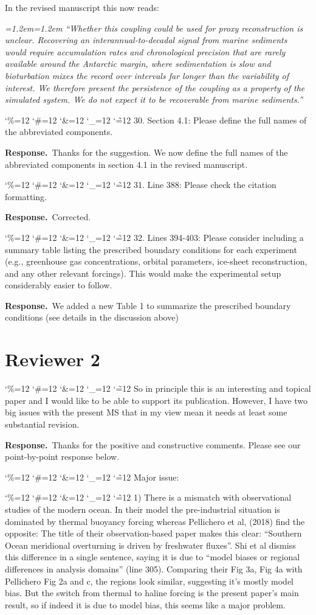 \documentclass[11pt,a4paper]{article}
\newcommand{\reviewer}[1]{\section*{#1}}
\newcommand{\comment}[1]{\par\medskip\noindent\color{black}\begingroup\catcode`\%=12 \catcode`\#=12 \catcode`\&=12 \catcode`\_=12 \catcode`\~=12 \commentbody}
\newcommand{\commentbody}[1]{#1\endgroup\par\smallskip}
\newcommand{\response}{\par\noindent\color{chgcol}\textbf{Response.}\ }
\newenvironment{change}{\par\smallskip\color{chgcol}\small\itshape\leftskip=1.2em\rightskip=1.2em\noindent\ignorespaces}{\par\smallskip}
\begin{document}
In the revised manuscript this now reads:

\begin{change}
``Whether this coupling could be used for proxy reconstruction is unclear. Recovering an interannual-to-decadal signal from marine sediments would require accumulation rates and chronological precision that are rarely available around the Antarctic margin, where sedimentation is slow and bioturbation mixes the record over intervals far longer than the variability of interest. We therefore present the persistence of the coupling as a property of the simulated system. We do not expect it to be recoverable from marine sediments.''
\end{change}

\comment{R1}{30. Section 4.1: Please define the full names of the abbreviated components.}

\response Thanks for the suggestion. We now define the full names of the abbreviated components in section 4.1 in the revised manuscript.

\comment{R1}{31. Line 388: Please check the citation formatting.}

\response Corrected.

\comment{R1}{32. Lines 394-403: Please consider including a summary table listing the prescribed boundary conditions for each experiment (e.g., greenhouse gas concentrations, orbital parameters, ice-sheet reconstruction, and any other relevant forcings). This would make the experimental setup considerably easier to follow.}

\response We added a new Table 1 to summarize the prescribed boundary conditions (see details in the discussion above)



\reviewer{Reviewer 2}

\comment{R2}{So in principle this is an interesting and topical paper and I would like to be able to support its publication. However, I have two big issues with the present MS that in my view mean it needs at least some substantial revision.}

\response Thanks for the positive and constructive comments. Please see our point-by-point response below.

\comment{R2}{Major issue:}

\comment{R2}{1) There is a mismatch with observational studies of the modern ocean. In their model the pre-industrial situation is dominated by thermal buoyancy forcing whereas Pellichero et al, (2018) find the opposite: The title of their observation-based paper makes this clear: “Southern Ocean meridional overturning is driven by freshwater fluxes”. Shi et al dismiss this difference in a single sentence, saying it is due to “model biases or regional differences in analysis domains” (line 305). Comparing their Fig 3a, Fig 4a with Pellichero Fig 2a and c, the regions look similar, suggesting it's mostly model bias. But the switch from thermal to haline forcing is the present paper's main result, so if indeed it is due to model bias, this seems like a major problem.}
\end{document}
